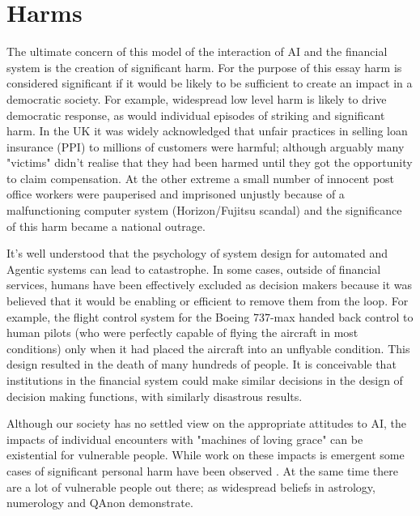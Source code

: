 \documentclass[11pt]{article}
\begin{document}
\section{Harms}\label{sec:harms}
The ultimate concern of this model of the interaction of AI and the financial system is the creation of significant harm.  For the purpose of this essay harm is considered significant if it would be likely to be sufficient to create an impact in a democratic society. For example, widespread low level harm is likely to drive democratic response, as would individual episodes of striking and significant harm. In the UK it was widely acknowledged that unfair practices in selling loan insurance (PPI) to millions of customers were harmful; although arguably many "victims" didn't realise that they had been harmed until they got the opportunity to claim compensation. At the other extreme a small number of innocent post office workers were pauperised and imprisoned unjustly because of a malfunctioning computer system (Horizon/Fujitsu scandal) and the significance of this harm became a national outrage. 

It's well understood that the psychology of system design for automated and Agentic systems can lead to catastrophe. In some cases, outside of financial services, humans have been effectively excluded as decision makers because it was believed that it would be enabling or efficient to remove them from the loop. For example, the flight control system for the Boeing 737-max handed back control to human pilots (who were perfectly capable of flying the aircraft in most conditions) only when it had placed the aircraft into an unflyable condition. This design resulted in the death of many hundreds of people. It is conceivable that institutions in the financial system could make similar decisions in the design of decision making functions, with similarly disastrous results.

Although our society has no settled view on the appropriate attitudes to AI, the impacts of individual encounters with "machines of loving grace" can be existential for vulnerable people. While work on these impacts is emergent \citep{ostergaardWillGenerativeArtificial2023,cleggShoggothsSycophancyPsychosis2025} some cases of significant personal harm have been observed \citep{eichenberger_case_2025}. At the same time there are a lot of vulnerable people out there; as widespread beliefs in astrology, numerology and QAnon demonstrate.
\end{document}
